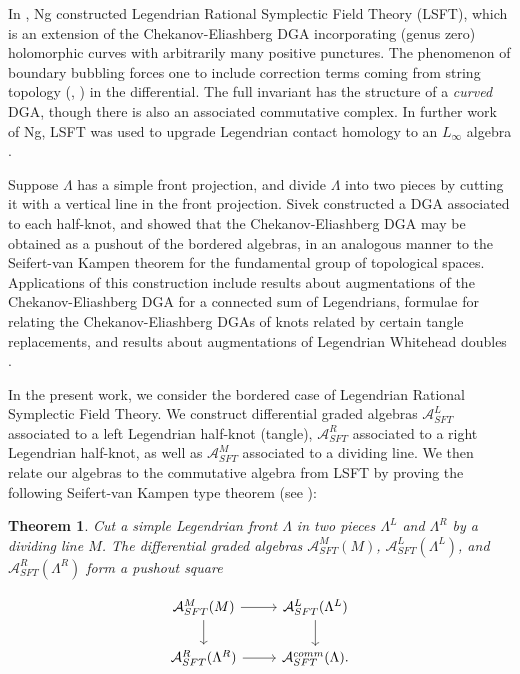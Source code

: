 \documentclass[a4paper,final, reqno]{amsart}
\theoremstyle{plain}
\newtheorem{Th}{Theorem}[section]
\theoremstyle{definition}
\newcommand{\A}{\mathcal{A}}
\begin{document}
	In \cite{ng}, Ng constructed Legendrian Rational Symplectic Field Theory (LSFT), which is an extension of the Chekanov-Eliashberg DGA incorporating (genus zero) holomorphic curves with arbitrarily many positive punctures. The phenomenon of boundary bubbling forces one to include correction terms coming from string topology (\cite{chas}, \cite{cieliebak}) in the differential. The full invariant has the structure of a \emph{curved} DGA, though there is also an associated commutative complex. In further work of Ng, LSFT was used to upgrade Legendrian contact homology to an $L_{\infty}$ algebra \cite{nglinfty}. 
	
	
	Suppose $\Lambda$ has a simple front projection, and divide $\Lambda$ into two pieces by cutting it with a vertical line in the front projection. Sivek \cite{sivek} constructed a DGA associated to each half-knot, and showed that the Chekanov-Eliashberg DGA may be obtained as a pushout of the bordered algebras, in an analogous manner to the Seifert-van Kampen theorem for the fundamental group of topological spaces. Applications of this construction include results about augmentations of the Chekanov-Eliashberg DGA for a connected sum of Legendrians, formulae for relating the Chekanov-Eliashberg DGAs of knots related by certain tangle replacements, and results about augmentations of Legendrian Whitehead doubles \cite{sivek}.
	
	In the present work, we consider the bordered case of Legendrian Rational Symplectic Field Theory. We construct differential graded algebras $\A^L_{SFT}$ associated to a left Legendrian half-knot (tangle), $\A^R_{SFT}$ associated to a right Legendrian half-knot, as well as $\A^M_{SFT}$ associated to a dividing line. We then relate our algebras to the commutative algebra from LSFT by proving the following Seifert-van Kampen type theorem (see ):
	
	
	\begin{Th}\label{thm:t1}
		Cut a simple Legendrian front $\Lambda$ in two pieces $\Lambda^L$ and $\Lambda^R$ by a dividing line $M$. The differential graded algebras $\A^M_{SFT}(M)$, $\A^L_{SFT}(\Lambda^L)$, and $\A^R_{SFT}(\Lambda^R)$ form a pushout square 
		
		\[\begin{tikzcd}
			\A^M_{SFT}(M) \arrow[r] \arrow[d] & \A^L_{SFT}(\Lambda^L) \arrow[d] \\
			\A^R_{SFT}(\Lambda^R) \arrow[r]           & \A^{comm}_{SFT}(\Lambda).
		\end{tikzcd} \]
	\end{Th}
	
\end{document}
